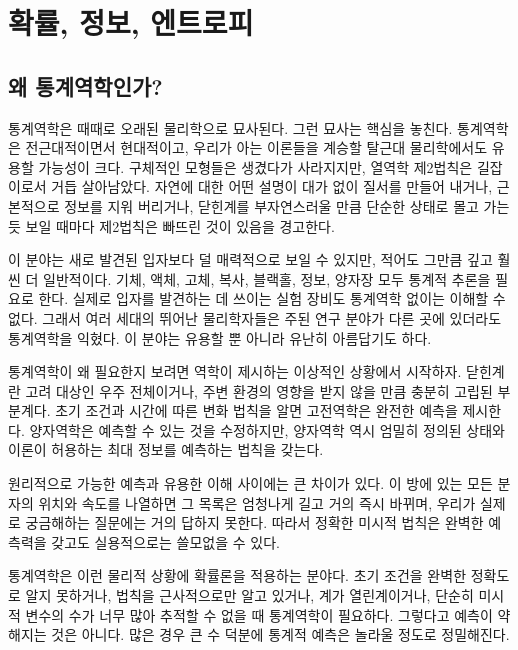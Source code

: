 \chapter{확률, 정보, 엔트로피}


\section{왜 통계역학인가?}

통계역학은 때때로 오래된 물리학으로 묘사된다. 그런 묘사는 핵심을 놓친다. 통계역학은 전근대적이면서 현대적이고, 우리가 아는 이론들을 계승할 탈근대 물리학에서도 유용할 가능성이 크다. 구체적인 모형들은 생겼다가 사라지지만, 열역학 제2법칙은 길잡이로서 거듭 살아남았다. 자연에 대한 어떤 설명이 대가 없이 질서를 만들어 내거나, 근본적으로 정보를 지워 버리거나, 닫힌계를 부자연스러울 만큼 단순한 상태로 몰고 가는 듯 보일 때마다 제2법칙은 빠뜨린 것이 있음을 경고한다.

이 분야는 새로 발견된 입자보다 덜 매력적으로 보일 수 있지만, 적어도 그만큼 깊고 훨씬 더 일반적이다. 기체, 액체, 고체, 복사, 블랙홀, 정보, 양자장 모두 통계적 추론을 필요로 한다. 실제로 입자를 발견하는 데 쓰이는 실험 장비도 통계역학 없이는 이해할 수 없다. 그래서 여러 세대의 뛰어난 물리학자들은 주된 연구 분야가 다른 곳에 있더라도 통계역학을 익혔다. 이 분야는 유용할 뿐 아니라 유난히 아름답기도 하다.

통계역학이 왜 필요한지 보려면 역학이 제시하는 이상적인 상황에서 시작하자. 닫힌계란 고려 대상인 우주 전체이거나, 주변 환경의 영향을 받지 않을 만큼 충분히 고립된 부분계다. 초기 조건과 시간에 따른 변화 법칙을 알면 고전역학은 완전한 예측을 제시한다. 양자역학은 예측할 수 있는 것을 수정하지만, 양자역학 역시 엄밀히 정의된 상태와 이론이 허용하는 최대 정보를 예측하는 법칙을 갖는다.

원리적으로 가능한 예측과 유용한 이해 사이에는 큰 차이가 있다. 이 방에 있는 모든 분자의 위치와 속도를 나열하면 그 목록은 엄청나게 길고 거의 즉시 바뀌며, 우리가 실제로 궁금해하는 질문에는 거의 답하지 못한다. 따라서 정확한 미시적 법칙은 완벽한 예측력을 갖고도 실용적으로는 쓸모없을 수 있다.

통계역학은 이런 물리적 상황에 확률론을 적용하는 분야다. 초기 조건을 완벽한 정확도로 알지 못하거나, 법칙을 근사적으로만 알고 있거나, 계가 열린계이거나, 단순히 미시적 변수의 수가 너무 많아 추적할 수 없을 때 통계역학이 필요하다. 그렇다고 예측이 약해지는 것은 아니다. 많은 경우 큰 수 덕분에 통계적 예측은 놀라울 정도로 정밀해진다.


